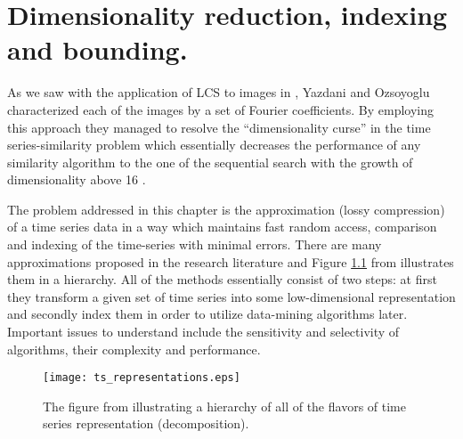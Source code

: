 \chapter{Dimensionality reduction, indexing and bounding.}
As we saw with the application of LCS to images in \cite{citeulike:4367061}, Yazdani and Ozsoyoglu characterized each of the images by a set of Fourier coefficients. By employing this approach they managed to resolve the ``dimensionality curse'' in the time series-similarity problem which essentially decreases the performance of any similarity algorithm to the one of the sequential search with the growth of dimensionality above 16 \cite{citeulike:4408223} \cite{citeulike:4384496} \cite{citeulike:2843857} \cite{citeulike:4384489} \cite{citeulike:343069}.

The problem addressed in this chapter is the approximation (lossy compression) of a time series data in a way which maintains fast random access, comparison and indexing of the time-series with minimal errors. There are many approximations proposed in the research literature and Figure \ref{fig:approximations} from \cite{citeulike:2821475} illustrates them in a hierarchy. All of the methods essentially consist of two steps: at first they transform a given set of time series into some low-dimensional representation and secondly index them in order to utilize data-mining algorithms later. Important issues to understand include the sensitivity and selectivity of algorithms, their complexity and performance.

\begin{figure}[tbp]
   \centering
   \texttt{[image: ts\_representations.eps]}
   \caption{The figure from \cite{citeulike:2821475} illustrating a hierarchy of all of the flavors of time series representation (decomposition).}
   \label{fig:approximations}
\end{figure} 
